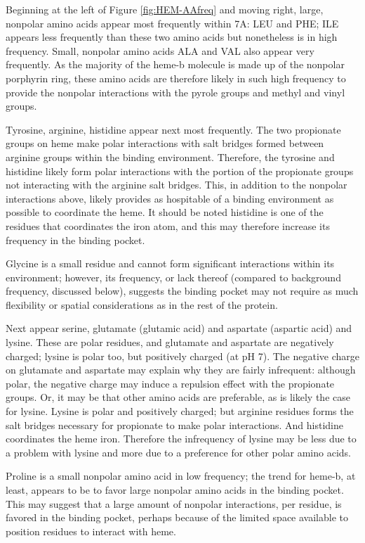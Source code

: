 \documentclass[a4paper, nobind]{templates/ociamthesis}
\begin{document}
Beginning at the left of Figure \ref{fig:HEM-AAfreq} and moving right, large, nonpolar amino acids appear most frequently within 7A: LEU and PHE; ILE appears less frequently than these two amino acids but nonetheless is in high frequency. Small, nonpolar amino acids ALA and VAL also appear very frequently. As the majority of the heme-b molecule is made up of the nonpolar porphyrin ring, these amino acids are therefore likely in such high frequency to provide the nonpolar interactions with the pyrole groups and methyl and vinyl groups.

Tyrosine, arginine, histidine appear next most frequently. The two propionate groups on heme make polar interactions with salt bridges formed between arginine groups within the binding environment\autocite{Barrows2005}. Therefore, the tyrosine and histidine likely form polar interactions with the portion of the propionate groups not interacting with the arginine salt bridges. This, in addition to the nonpolar interactions above, likely provides as hospitable of a binding environment as possible to coordinate the heme. It should be noted histidine is one of the residues that coordinates the iron atom, and this may therefore increase its frequency in the binding pocket.

Glycine is a small residue and cannot form significant interactions within its environment; however, its frequency, or lack thereof (compared to background frequency, discussed below), suggests the binding pocket may not require as much flexibility or spatial considerations as in the rest of the protein.

Next appear serine, glutamate (glutamic acid) and aspartate (aspartic acid) and lysine. These are polar residues, and glutamate and aspartate are negatively charged; lysine is polar too, but positively charged (at pH 7). The negative charge on glutamate and aspartate may explain why they are fairly infrequent: although polar, the negative charge may induce a repulsion effect with the propionate groups. Or, it may be that other amino acids are preferable, as is likely the case for lysine. Lysine is polar and positively charged; but arginine residues forms the salt bridges necessary for propionate to make polar interactions. And histidine coordinates the heme iron. Therefore the infrequency of lysine may be less due to a problem with lysine and more due to a preference for other polar amino acids.

Proline is a small nonpolar amino acid in low frequency; the trend for heme-b, at least, appears to be to favor large nonpolar amino acids in the binding pocket. This may suggest that a large amount of nonpolar interactions, per residue, is favored in the binding pocket, perhaps because of the limited space available to position residues to interact with heme.
\end{document}
